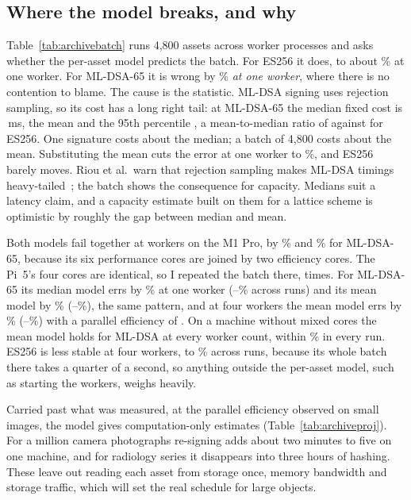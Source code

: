\subsection{Where the model breaks, and why}



Table~\ref{tab:archivebatch} runs 4,800 assets across worker processes and
asks whether the per-asset model predicts the batch. For ES256 it does, to about \NarchErrOneES\% at one worker. For ML-DSA-65 it is wrong by
\NarchErrOneDSAsixtyfive\% \emph{at one worker}, where there is no contention
to blame. The cause is the statistic. ML-DSA signing uses rejection sampling,
so its cost has a long right tail: at ML-DSA-65 the median fixed cost is
\NarchFixMed\,ms, the mean \NarchFixMean{} and the 95th percentile
\NarchFixPnf, a mean-to-median ratio of \NarchTail{} against \NarchTailES{} for
ES256. One signature costs about the median; a batch of 4,800 costs about the
mean. Substituting the mean cuts the error at one worker to
\NarchErrMeanOneDSAsixtyfive\%, and ES256 barely moves. Riou et al.\ warn that
rejection sampling makes ML-DSA timings heavy-tailed~\cite{riou2026}; the
batch shows the consequence for capacity. Medians suit a latency claim, and a
capacity estimate built on them for a lattice scheme is optimistic by roughly
the gap between median and mean.

Both models fail together at \NarchMaxWorkers{} workers on the M1 Pro, by \NarchErrMaxDSAsixtyfive\% and \NarchErrMeanMaxDSAsixtyfive\% for ML-DSA-65, because its six performance cores
are joined by two efficiency cores. The Pi~5's four cores are identical, so I repeated the batch there, \NarchPiRuns{} times. For ML-DSA-65 its median model errs by \NarchPiErrOneDSAsixtyfive\% at one worker (\NarchPiErrOneDSAsixtyfiveLo--\NarchPiErrOneDSAsixtyfiveHi\% across runs) and its mean model by \NarchPiErrMeanOneDSAsixtyfive\% (\NarchPiErrMeanOneDSAsixtyfiveLo--\NarchPiErrMeanOneDSAsixtyfiveHi\%), the same pattern, and at four workers the mean model errs by \NarchPiErrMeanMaxDSAsixtyfive\% (\NarchPiErrMeanMaxDSAsixtyfiveLo--\NarchPiErrMeanMaxDSAsixtyfiveHi\%) with a parallel efficiency of \NarchPiEffMaxDSAsixtyfive. On a machine without mixed cores the mean model holds for ML-DSA at every worker count, within \NarchPiErrMeanAllMaxDSAsixtyfive\% in every run. ES256 is less stable at four workers, \NarchPiErrMeanMaxESLo{} to \NarchPiErrMeanMaxESHi\% across runs, because its whole batch there takes a quarter of a second, so anything outside the per-asset model, such as starting the workers, weighs heavily.

Carried past what was measured, at the parallel efficiency observed on small
images, the model gives computation-only estimates (Table~\ref{tab:archiveproj}). For a million camera photographs re-signing adds about two
minutes to five on one machine, and for radiology series it disappears into
three hours of hashing. These leave out reading each asset from storage once,
memory bandwidth and storage traffic, which will set the real schedule for
large objects.
